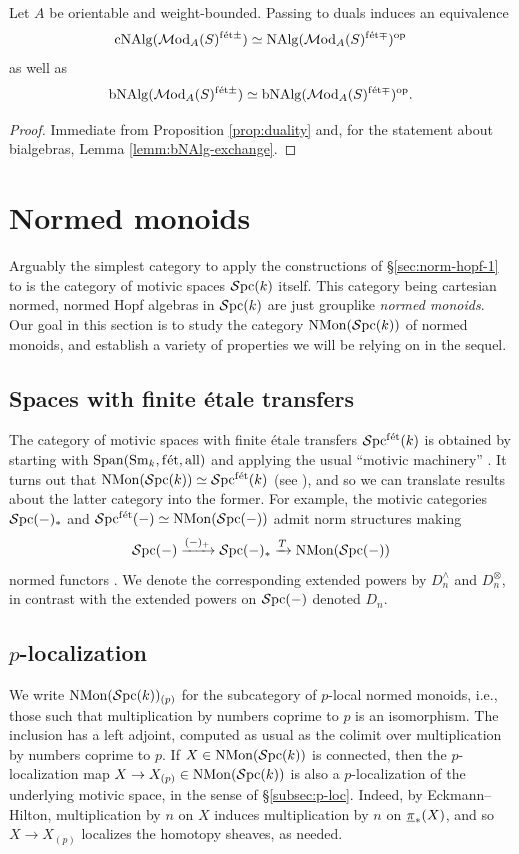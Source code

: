 \documentclass{amsart}
\numberwithin{proposition}{section}
\numberwithin{equation}{section}
\def\fet{\mathrm{f\acute et}}
\def\all{\mathrm{all}}
\def\NMon{\mathrm{NMon}}
\def\cNAlg{\mathrm{cNAlg}}
\def\bNAlg{\mathrm{bNAlg}}
\begin{document}
\begin{lemma} \label{lemm:duals-cNAlg}
Let $A$ be orientable and weight-bounded.
Passing to duals induces an equivalence \[ \cNAlg(\Mod_A(S)^{\fet\pm}) \wequi \NAlg(\Mod_A(S)^{\fet\mp})^\op \] as well as \[ \bNAlg(\Mod_{A}(S)^{\fet\pm}) \wequi \bNAlg(\Mod_{A}(S)^{\fet\mp})^\op. \]
\end{lemma}
\begin{proof}
Immediate from Proposition \ref{prop:duality} and, for the statement about bialgebras, Lemma \ref{lemm:bNAlg-exchange}.
\end{proof}



\section{Normed monoids} \label{sec:normed-monoids}
Arguably the simplest category to apply the constructions of \S\ref{sec:norm-hopf-1} to is the category of motivic spaces $\mathcal{S}\mathrm{pc}{}(k)$ itself.
This category being cartesian normed, normed Hopf algebras in $\mathcal{S}\mathrm{pc}{}(k)$ are just grouplike \emph{normed monoids}.
Our goal in this section is to study the category $\NMon(\Spc(k))$ of normed monoids, and establish a variety of properties we will be relying on in the sequel.


\subsection{Spaces with finite étale transfers} \label{subsec:Spc-fet}
The category of motivic spaces with finite étale transfers $\Spc^\fet(k)$ is obtained by starting with $\Span(\Sm_k, \fet, \all)$ and applying the usual ``motivic machinery'' \cite[Definition~3.22]{bachmann-MGM}.
It turns out that $\NMon(\Spc(k)) \wequi \Spc^\fet(k)$ (see \cite[Remark 16.18]{bachmann-norms}), and so we can translate results about the latter category into the former.
For example, the motivic categories $\mathcal{S}\mathrm{pc}{}(\mathord-)_*$ and $\Spc^\fet(\ph) \wequi \NMon(\Spc(\ph))$ admit norm structures making \[ \Spc(\ph) \xrightarrow{(\ph)_+} \Spc(\ph)_* \xrightarrow{T} \NMon(\Spc(\ph)) \] normed functors \cite[\S3.3.3, (4)]{bachmann-MGM}.
We denote the corresponding extended powers by $D_n^\wedge$ and $D_n^\otimes$, in contrast with the extended powers on $\mathcal{S}\mathrm{pc}{}(\mathord-)$ denoted $D_n$.

\subsection{$p$-localization} \label{subsub:mon-ploc}
We write $\NMon(\Spc(k))_{(p)}$ for the subcategory of $p$-local normed monoids, i.e., those such that multiplication by numbers coprime to $p$ is an isomorphism.
The inclusion has a left adjoint, computed as usual as the colimit over multiplication by numbers coprime to $p$.
If $X \in \NMon(\Spc(k))$ is connected, then the $p$-localization map $X \to X_{(p)} \in \NMon(\Spc(k))$ is also a $p$-localization of the underlying motivic space, in the sense of \S\ref{subsec:p-loc}.
Indeed, by Eckmann--Hilton, multiplication by $n$ on $X$ induces multiplication by $n$ on $\underline\pi_*(X)$, and so $X \to X_{(p)}$ localizes the homotopy sheaves, as needed.
\end{document}
